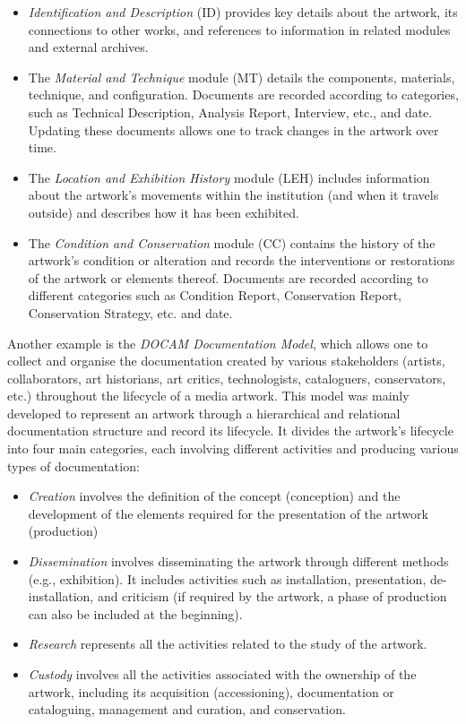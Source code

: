 \begin{itemize}
    \item \textit{Identification and Description} (ID) provides key details about the artwork, its connections to other works, and references to information in related modules and external archives.
    \item The \textit{Material and Technique} module (MT) details the components, materials, technique, and configuration. Documents are recorded according to categories, such as Technical Description, Analysis Report, Interview, etc., and date. Updating these documents allows one to track changes in the artwork over time.
    \item The \textit{Location and Exhibition History} module (LEH) includes information about the artwork's movements within the institution (and when it travels outside) and describes how it has been exhibited.
    \item The \textit{Condition and Conservation} module (CC) contains the history of the artwork’s condition or alteration and records the interventions or restorations of the artwork or elements thereof. Documents are recorded according to different categories such as Condition Report, Conservation Report, Conservation Strategy, etc. and date. 
\end{itemize}

Another example is the \textit{DOCAM Documentation Model}, which allows one to collect and organise the documentation created by various stakeholders (artists, collaborators, art historians, art critics, technologists, cataloguers, conservators, etc.) throughout the lifecycle of a media artwork. This model was mainly developed to represent an artwork through a hierarchical and relational documentation structure and record its lifecycle. It divides the artwork's lifecycle into four main categories, each involving different activities and producing various types of documentation:
\begin{itemize}
    \item \textit{Creation} involves the definition of the concept (conception) and the development of the elements required for the presentation of the artwork (production)
    \item \textit{Dissemination} involves disseminating the artwork through different methods (e.g., exhibition). It includes activities such as installation, presentation, de-installation, and criticism (if required by the artwork, a phase of production can also be included at the beginning).
    \item \textit{Research} represents all the activities related to the study of the artwork.
    \item \textit{Custody} involves all the activities associated with the ownership of the artwork, including its acquisition (accessioning), documentation or cataloguing, management and curation, and conservation.    
\end{itemize}

